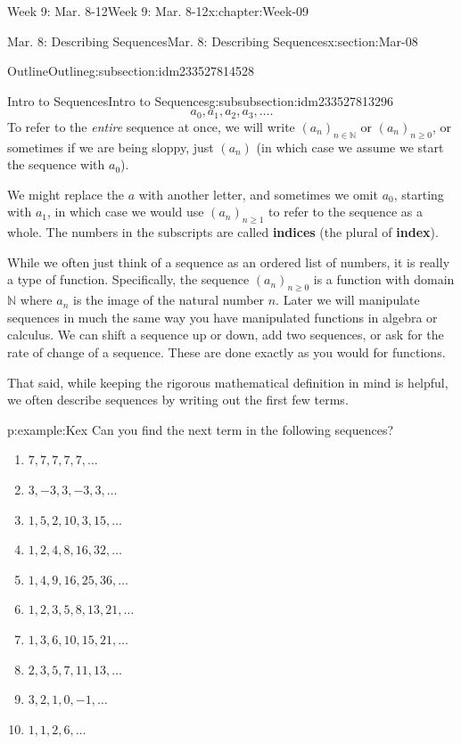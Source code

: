 \documentclass[oneside,10pt,]{book}
\newcommand{\terminology}[1]{\textbf{#1}}
\numberwithin{equation}{section}
\renewcommand{\ge}{\geqslant}
\def\N{{\mathbb N}}
\newcommand{\N}{\mathbb N}
\begin{document}
\begin{chapterptx}{Week 9: Mar. 8-12}{}{Week 9: Mar. 8-12}{}{}{x:chapter:Week-09}
\begin{sectionptx}{Mar. 8: Describing Sequences}{}{Mar. 8: Describing Sequences}{}{}{x:section:Mar-08}
\begin{subsectionptx}{Outline}{}{Outline}{}{}{g:subsection:idm233527814528}
\begin{subsubsectionptx}{Intro to Sequences}{}{Intro to Sequences}{}{}{g:subsubsection:idm233527813296}
\begin{equation*}
a_0, a_1, a_2, a_3, \ldots\text{.}
\end{equation*}
To refer to the \emph{entire} sequence at once, we will write \((a_n)_{n\in\N}\) or \((a_n)_{n\ge 0}\), or sometimes if we are being sloppy, just \((a_n)\) (in which case we assume we start the sequence with \(a_0\)). \label{g:notation:idm233527805984}%
\par
We might replace the \(a\) with another letter, and sometimes we omit \(a_0\), starting with \(a_1\), in which case we would use \((a_n)_{n \ge 1}\) to refer to the sequence as a whole. The numbers in the subscripts are called \terminology{indices} (the plural of \terminology{index}).%
\par
{} While we often just think of a sequence as an ordered list of numbers, it is really a type of function. Specifically, the sequence \((a_n)_{n\ge 0}\) is a function with domain \(\N\) where \(a_n\) is the image of the natural number \(n\). Later we will manipulate sequences in much the same way you have manipulated functions in algebra or calculus. We can shift a sequence up or down, add two sequences, or ask for the rate of change of a sequence. These are done exactly as you would for functions.%
\par
That said, while keeping the rigorous mathematical definition in mind is helpful, we often describe sequences by writing out the first few terms.%
\begin{example}{}{p:example:Kex}%
Can you find the next term in the following sequences?%
\par
%
\begin{enumerate}
\item{}\(\displaystyle 7,7,7,7,7, \ldots\)%
\item{}\(\displaystyle 3, -3, 3, -3, 3, \ldots\)%
\item{}\(\displaystyle 1, 5, 2, 10, 3, 15, \ldots\)%
\item{}\(\displaystyle 1, 2, 4, 8, 16, 32, \ldots\)%
\item{}\(\displaystyle 1, 4, 9, 16, 25, 36, \ldots\)%
\item{}\(\displaystyle 1, 2, 3, 5, 8, 13, 21, \ldots\)%
\item{}\(\displaystyle 1, 3, 6, 10, 15, 21, \ldots\)%
\item{}\(\displaystyle 2, 3, 5, 7, 11, 13, \ldots\)%
\item{}\(\displaystyle 3, 2, 1, 0, -1, \ldots\)%
\item{}\(\displaystyle 1, 1, 2, 6, \ldots\)%

\end{enumerate}
\end{example}
\end{subsubsectionptx}
\end{subsectionptx}
\end{sectionptx}
\end{chapterptx}
\end{document}
